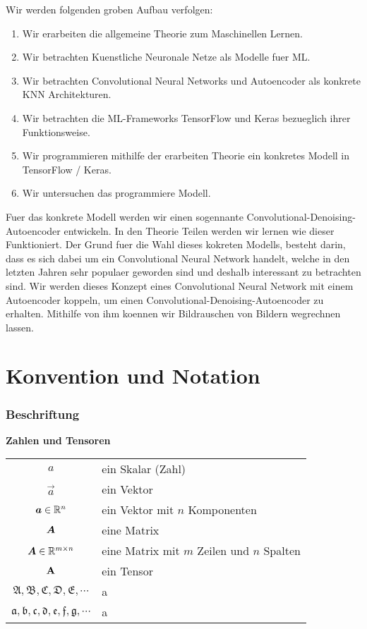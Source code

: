 Wir werden folgenden groben Aufbau verfolgen:

\begin{enumerate}
  \item{Wir erarbeiten die allgemeine Theorie zum Maschinellen Lernen.}
  \item{Wir betrachten Kuenstliche Neuronale Netze als Modelle fuer ML.}
  \item{Wir betrachten Convolutional Neural Networks und Autoencoder als
      konkrete KNN Architekturen.}
  \item{Wir betrachten die ML-Frameworks TensorFlow und Keras bezueglich ihrer Funktionsweise.}
  \item{Wir programmieren mithilfe der erarbeiten Theorie ein konkretes Modell
      in TensorFlow / Keras.}
    \item{Wir untersuchen das programmiere Modell.}

\end{enumerate}

Fuer das konkrete Modell werden wir einen sogennante
Convolutional-Denoising-Autoencoder entwickeln. In den Theorie Teilen werden wir
lernen wie dieser Funktioniert. Der Grund fuer die Wahl dieses kokreten Modells,
besteht darin, dass es sich dabei um ein Convolutional Neural Network handelt,
welche in den letzten Jahren sehr populaer geworden sind und deshalb interessant
zu betrachten sind. Wir werden dieses Konzept eines Convolutional Neural Network
mit einem Autoencoder koppeln, um einen Convolutional-Denoising-Autoencoder zu
erhalten. Mithilfe von ihm koennen wir Bildrauschen von Bildern wegrechnen lassen.


\chapter*{Konvention und Notation}

\subsection*{Beschriftung}

\begin{center}\textbf{Zahlen und Tensoren}\end{center}
\begin{tabular}{cl}
  $a$ & ein Skalar (Zahl) \\
  $\vec{a}$ & ein Vektor \\
  $\bm{a} \in \mathbb{R}^{n}$ & ein Vektor mit $n$ Komponenten \\
  $\bm{A}$ & eine Matrix \\
  $\bm{A} \in \mathbb{R}^{m \times n}$ & eine Matrix mit $m$ Zeilen und $n$ Spalten \\
  $\mathbf{A}$ & ein Tensor \\
  $\mathfrak{A,B,C,D,E,\cdots}$ & a \\
  $\mathfrak{a,b,c,d,e,f,g,\cdots}$ & a \\


\end{tabular}

